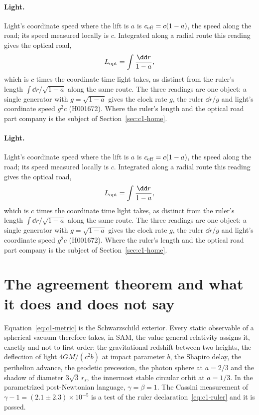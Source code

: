 \paragraph{Light.} Light's coordinate speed where the lift is $a$ is $c_{\rm eff}=c(1-a)$, the speed along the road; its speed measured locally is $c$. Integrated along a radial route this reading gives the optical road,
\begin{equation}
L_{\rm opt}=\int\frac{\dd r}{1-a},
\label{eq:c1-optical-road}
\end{equation}
which is $c$ times the coordinate time light takes, as distinct from the ruler's length $\int\dd r/\sqrt{1-a}$ along the same route. The three readings are one object: a single generator with $g=\sqrt{1-a}$ gives the clock rate $g$, the ruler $\dd r/g$ and light's coordinate speed $g^2c$ (H001672). Where the ruler's length and the optical road part company is the subject of Section~\ref{sec:c1-home}.

\paragraph{Light.} Light's coordinate speed where the lift is $a$ is $c_{\rm eff}=c(1-a)$, the speed along the road; its speed measured locally is $c$. Integrated along a radial route this reading gives the optical road,
\begin{equation}
L_{\rm opt}=\int\frac{\dd r}{1-a},
\label{eq:c1-optical-road}
\end{equation}
which is $c$ times the coordinate time light takes, as distinct from the ruler's length $\int\dd r/\sqrt{1-a}$ along the same route. The three readings are one object: a single generator with $g=\sqrt{1-a}$ gives the clock rate $g$, the ruler $\dd r/g$ and light's coordinate speed $g^2c$ (H001672). Where the ruler's length and the optical road part company is the subject of Section~\ref{sec:c1-home}.

\section{The agreement theorem and what it does and does not say}
\label{sec:c1-agreement}

Equation~\eqref{eq:c1-metric} is the Schwarzschild exterior. Every static observable of a spherical vacuum therefore takes, in SAM, the value general relativity assigns it, exactly and not to first order: the gravitational redshift between two heights, the deflection of light $4GM/(c^2 b)$ at impact parameter $b$, the Shapiro delay, the perihelion advance, the geodetic precession, the photon sphere at $a=2/3$ and the shadow of diameter $3\sqrt3\,r_s$, the innermost stable circular orbit at $a=1/3$. In the parametrized post-Newtonian language, $\gamma=\beta=1$. The Cassini measurement of $\gamma-1=(2.1\pm2.3)\times10^{-5}$ is a test of the ruler declaration~\eqref{eq:c1-ruler} and it is passed.

